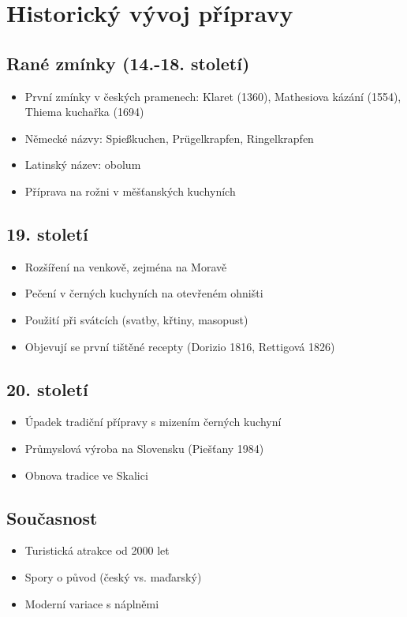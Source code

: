 \documentclass[a5paper,10pt]{book}
\begin{document}
\chapter{Historický vývoj přípravy}
\section{Rané zmínky (14.-18. století)}
\begin{itemize}
\item První zmínky v českých pramenech: Klaret (1360), Mathesiova kázání (1554), Thiema kuchařka (1694)
\item Německé názvy: Spießkuchen, Prügelkrapfen, Ringelkrapfen
\item Latinský název: obolum
\item Příprava na rožni v měšťanských kuchyních
\end{itemize}

\section{19. století}
\begin{itemize}
\item Rozšíření na venkově, zejména na Moravě
\item Pečení v černých kuchyních na otevřeném ohništi
\item Použití při svátcích (svatby, křtiny, masopust)
\item Objevují se první tištěné recepty (Dorizio 1816, Rettigová 1826)
\end{itemize}

\section{20. století}
\begin{itemize}
\item Úpadek tradiční přípravy s mizením černých kuchyní
\item Průmyslová výroba na Slovensku (Piešťany 1984)
\item Obnova tradice ve Skalici
\end{itemize}

\section{Současnost}
\begin{itemize}
\item Turistická atrakce od 2000 let
\item Spory o původ (český vs. maďarský)
\item Moderní variace s náplněmi
\end{itemize}
\end{document}
